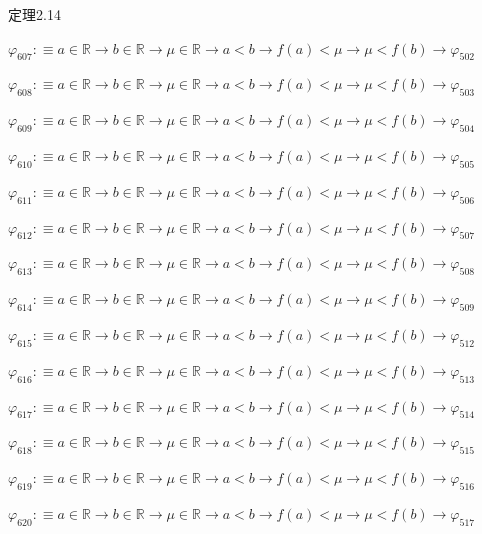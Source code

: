 \begin{fullproof}{定理2.14}
\begin{abbrevlist}
\item $\varphi_{607} :\equiv a \in \mathbb{R} \to b \in \mathbb{R} \to \mu \in \mathbb{R} \to a < b \to f(a) < \mu \to \mu < f(b) \to \varphi_{502}$
\item $\varphi_{608} :\equiv a \in \mathbb{R} \to b \in \mathbb{R} \to \mu \in \mathbb{R} \to a < b \to f(a) < \mu \to \mu < f(b) \to \varphi_{503}$
\item $\varphi_{609} :\equiv a \in \mathbb{R} \to b \in \mathbb{R} \to \mu \in \mathbb{R} \to a < b \to f(a) < \mu \to \mu < f(b) \to \varphi_{504}$
\item $\varphi_{610} :\equiv a \in \mathbb{R} \to b \in \mathbb{R} \to \mu \in \mathbb{R} \to a < b \to f(a) < \mu \to \mu < f(b) \to \varphi_{505}$
\item $\varphi_{611} :\equiv a \in \mathbb{R} \to b \in \mathbb{R} \to \mu \in \mathbb{R} \to a < b \to f(a) < \mu \to \mu < f(b) \to \varphi_{506}$
\item $\varphi_{612} :\equiv a \in \mathbb{R} \to b \in \mathbb{R} \to \mu \in \mathbb{R} \to a < b \to f(a) < \mu \to \mu < f(b) \to \varphi_{507}$
\item $\varphi_{613} :\equiv a \in \mathbb{R} \to b \in \mathbb{R} \to \mu \in \mathbb{R} \to a < b \to f(a) < \mu \to \mu < f(b) \to \varphi_{508}$
\item $\varphi_{614} :\equiv a \in \mathbb{R} \to b \in \mathbb{R} \to \mu \in \mathbb{R} \to a < b \to f(a) < \mu \to \mu < f(b) \to \varphi_{509}$
\item $\varphi_{615} :\equiv a \in \mathbb{R} \to b \in \mathbb{R} \to \mu \in \mathbb{R} \to a < b \to f(a) < \mu \to \mu < f(b) \to \varphi_{512}$
\item $\varphi_{616} :\equiv a \in \mathbb{R} \to b \in \mathbb{R} \to \mu \in \mathbb{R} \to a < b \to f(a) < \mu \to \mu < f(b) \to \varphi_{513}$
\item $\varphi_{617} :\equiv a \in \mathbb{R} \to b \in \mathbb{R} \to \mu \in \mathbb{R} \to a < b \to f(a) < \mu \to \mu < f(b) \to \varphi_{514}$
\item $\varphi_{618} :\equiv a \in \mathbb{R} \to b \in \mathbb{R} \to \mu \in \mathbb{R} \to a < b \to f(a) < \mu \to \mu < f(b) \to \varphi_{515}$
\item $\varphi_{619} :\equiv a \in \mathbb{R} \to b \in \mathbb{R} \to \mu \in \mathbb{R} \to a < b \to f(a) < \mu \to \mu < f(b) \to \varphi_{516}$
\item $\varphi_{620} :\equiv a \in \mathbb{R} \to b \in \mathbb{R} \to \mu \in \mathbb{R} \to a < b \to f(a) < \mu \to \mu < f(b) \to \varphi_{517}$

\end{abbrevlist}
\end{fullproof}
